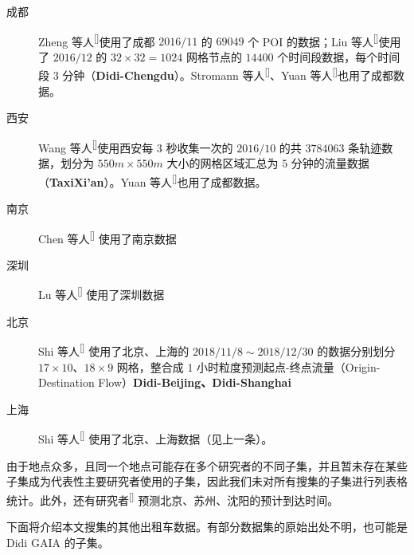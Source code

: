 \documentclass{ctexart}
\renewcommand{\cite}[1]{\textsuperscript{[\citenum{#1}]}}
\begin{document}
\begin{description}
    \begin{description}
        \item[成都] Zheng 等人\cite{T-177}使用了成都 $2016/11$ 的 $69049$ 个 POI 的数据；Liu 等人\cite{T-297}使用了 $2016/12$ 的 $32\times32=1024$ 网格节点的 $14400$ 个时间段数据，每个时间段 $3$ 分钟（\textbf{Didi-Chengdu}）。Stromann 等人\cite{T-265}、Yuan 等人\cite{T-293}也用了成都数据。
        \item[西安] Wang 等人\cite{T-343}使用西安每 $3$ 秒收集一次的 $2016/10$ 的共 $3784063$ 条轨迹数据，划分为 $550m\times550m$ 大小的网格区域汇总为 $5$ 分钟的流量数据（\textbf{TaxiXi'an}）。Yuan 等人\cite{T-293}也用了成都数据。
        \item[南京] Chen 等人\cite{T-270} 使用了南京数据
        \item[深圳] Lu 等人\cite{T-279} 使用了深圳数据  
        \item[北京] Shi 等人\cite{T-306} 使用了北京、上海的 $2018/11/8\sim2018/12/30$ 的数据分别划分 $17\times10$、$18\times9$ 网格，整合成 $1$ 小时粒度预测起点-终点流量（Origin-Destination Flow）\textbf{Didi-Beijing、Didi-Shanghai}
        \item[上海] Shi 等人\cite{T-306} 使用了北京、上海数据（见上一条）。
    \end{description}
    由于地点众多，且同一个地点可能存在多个研究者的不同子集，并且暂未存在某些子集成为代表性主要研究者使用的子集，因此我们未对所有搜集的子集进行列表格统计。此外，还有研究者\cite{T-316,T-318} 预测北京、苏州、沈阳的预计到达时间。
\end{description}

下面将介绍本文搜集的其他出租车数据。有部分数据集的原始出处不明，也可能是 Didi GAIA 的子集。
\end{document}
